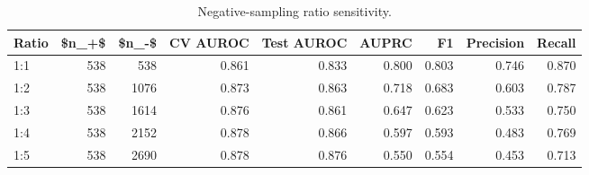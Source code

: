 \begin{table}[htbp]
\centering
\caption{Negative-sampling ratio sensitivity.}
\label{tab:robustness_recomputed}
\begin{tabular}{lrrrrrrrr}
\toprule
Ratio & \$n\_+\$ & \$n\_-\$ & CV AUROC & Test AUROC & AUPRC & F1 & Precision & Recall \\
\midrule
1:1 & 538 & 538 & 0.861 & 0.833 & 0.800 & 0.803 & 0.746 & 0.870 \\
1:2 & 538 & 1076 & 0.873 & 0.863 & 0.718 & 0.683 & 0.603 & 0.787 \\
1:3 & 538 & 1614 & 0.876 & 0.861 & 0.647 & 0.623 & 0.533 & 0.750 \\
1:4 & 538 & 2152 & 0.878 & 0.866 & 0.597 & 0.593 & 0.483 & 0.769 \\
1:5 & 538 & 2690 & 0.878 & 0.876 & 0.550 & 0.554 & 0.453 & 0.713 \\
\bottomrule
\end{tabular}

\end{table}

